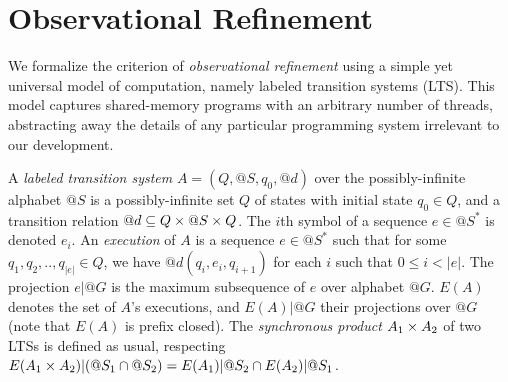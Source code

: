 \section{Observational Refinement}
\label{sec:refinement}


We formalize the criterion of \emph{observational refinement} using a simple
yet universal model of computation, namely labeled transition systems (LTS).
This model captures shared-memory programs with an arbitrary number of threads,
abstracting away the details of any particular programming system irrelevant to
our development.

A \emph{labeled transition system} $A = (Q,@S,q_0,@d)$ over the
possibly-infinite alphabet $@S$ is a possibly-infinite set $Q$ of states with
initial state $q_0 \in Q$, and a transition relation $@d \subseteq Q \times @S \times
Q$. The $i$th symbol of a sequence $e \in @S^*$ is denoted $e_i$. An
\emph{execution} of $A$ is a sequence $e \in @S^*$ such that for some $q_1,
q_2, .., q_{|e|} \in Q$, we have $@d(q_i,e_i,q_{i+1})$ for each $i$ such that
$0 \le i < |e|$. The projection $e|@G$ is the maximum subsequence of $e$ over
alphabet $@G$. $E(A)$ denotes the set of $A$'s executions, and $E(A)|@G$ their
projections over $@G$ (note that $E(A)$ is prefix closed). 
The \emph{synchronous product} $A_1 \times A_2$ of two LTSs
is defined as usual, respecting $E(A_1 \times A_2)|(@S_1 \cap @S_2) = E(A_1)|@S_2 \cap
E(A_2)|@S_1$.

%
%  
%

